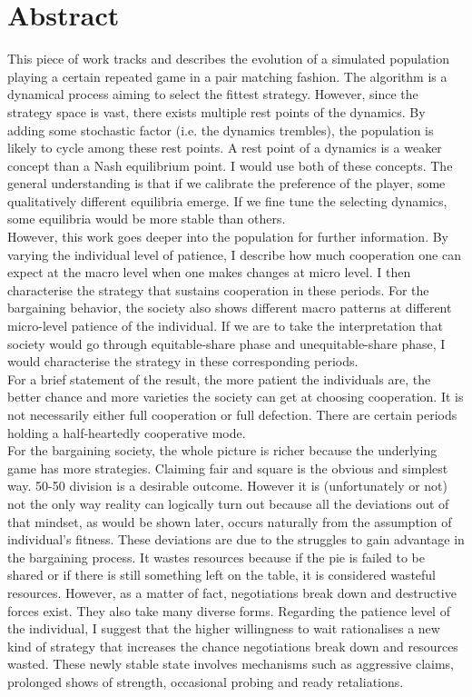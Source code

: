 \documentclass[12.5pt]{report}
\begin{document}
\chapter*{Abstract}

This piece of work tracks and describes the evolution of a simulated population playing a certain repeated game in a pair matching fashion. The algorithm is a dynamical process aiming to select the fittest strategy. However, since the strategy space is vast, there exists multiple rest points of the dynamics. By adding some stochastic factor (i.e. the dynamics trembles), the population is likely to cycle among these rest points. A rest point of a dynamics is a weaker concept than a Nash equilibrium point. I would use both of these concepts. The general understanding is that if we calibrate the preference of the player, some qualitatively different equilibria emerge. If we fine tune the selecting dynamics, some equilibria would be more stable than others.\\

However, this work goes deeper into the population for further information. By varying the individual level of patience, I describe how much cooperation one can expect at the macro level when one makes changes at micro level. I then characterise the strategy that sustains cooperation in these periods. For the bargaining behavior, the society also shows different macro patterns at different micro-level patience of the individual. If we are to take the interpretation that society would go through equitable-share phase and unequitable-share phase, I would characterise the strategy in these corresponding periods.\\

For a brief statement of the result, the more patient the individuals are, the better chance and more varieties the society can get at choosing cooperation. It is not necessarily either full cooperation or full defection. There are certain periods holding a half-heartedly cooperative mode.\\

For the bargaining society, the whole picture is richer because the underlying game has more strategies. Claiming fair and square is the obvious and simplest way. 50-50 division is a desirable outcome. However it is (unfortunately or not) not the only way reality can logically turn out because all the deviations out of that mindset, as would be shown later, occurs naturally from the assumption of individual's fitness. These deviations are due to the struggles to gain advantage in the bargaining process. It wastes resources because if the pie is failed to be shared or if there is still something left on the table, it is considered wasteful resources. However, as a matter of fact, negotiations break down and destructive forces exist. They also take many diverse forms. Regarding the patience level of the individual, I suggest that the higher willingness to wait rationalises a new kind of strategy that increases the chance negotiations break down and resources wasted. These newly stable state involves mechanisms such as aggressive claims, prolonged shows of strength, occasional probing and ready retaliations. 
\end{document}

